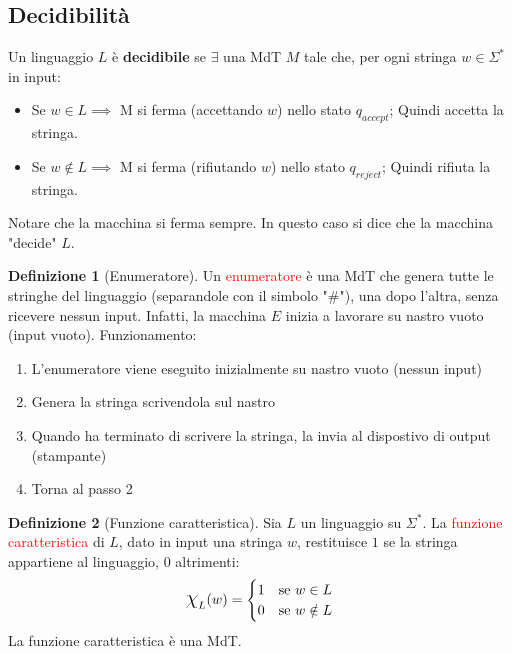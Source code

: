 \documentclass{article}  %
\theoremstyle{definition}
\newtheorem{definition}{Definizione}[section]
\begin{document}
\subsection{Decidibilità}
Un linguaggio $L$ è \textbf{decidibile} se $\exists$ una MdT $M$ tale che, per ogni stringa $w\in \Sigma^*$ in input:
\begin{itemize}
	\item Se $w \in L \implies$ M si ferma (accettando $w$) nello stato $q_{accept}$; Quindi accetta la stringa.
	\item Se $w \notin L \implies$ M si ferma (rifiutando $w$) nello stato $q_{reject}$; Quindi rifiuta la stringa.
\end{itemize}
Notare che la macchina si ferma sempre. In questo caso si dice che la macchina "decide" $L$.
\begin{definition}[Enumeratore]
	Un \textcolor{red}{enumeratore} è una MdT che genera tutte le stringhe del linguaggio (separandole con il simbolo "$\#$"),
	una dopo l'altra, senza ricevere nessun input. Infatti, la macchina $E$ inizia a lavorare su nastro vuoto (input vuoto). \newline \newline
	Funzionamento:
	\begin{enumerate}
		\item L'enumeratore viene eseguito inizialmente su nastro vuoto (nessun input)
		\item Genera la stringa scrivendola sul nastro
		\item Quando ha terminato di scrivere la stringa, la invia al dispostivo di output (stampante)
		\item Torna al passo 2
	\end{enumerate}
\end{definition}
\begin{definition}[Funzione caratteristica]
	Sia $L$ un linguaggio su $\Sigma^*$. La \textcolor{red}{funzione caratteristica} di $L$, dato in input una stringa $w$, restituisce $1$ se la stringa appartiene al linguaggio,
	$0$ altrimenti:
	\[
		\mbox{\Large$\chi$}_L (w) =
		\begin{cases}
			\text{1} & \text{se } w \in L    \\
			\text{0} & \text{se } w \notin L
		\end{cases}
	\]
	La funzione caratteristica è una MdT.
\end{definition}
\end{document}
